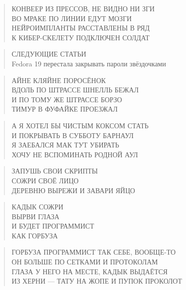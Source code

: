 \poemtitle{***}
\begin{verse}
КОНВЕЕР ИЗ ПРЕССОВ, НЕ ВИДНО НИ ЗГИ\\
ВО МРАКЕ ПО ЛИНИИ ЕДУТ МОЗГИ\\
НЕЙРОИМПЛАНТЫ РАССТАВЛЕНЫ В РЯД\\
К КИБЕР-СКЕЛЕТУ ПОДКЛЮЧЕН СОЛДАТ
\end{verse}

\poemtitle{***}
\begin{verse}
СЛЕДУЮЩИЕ СТАТЬИ\\
Fedora 19 перестала закрывать пароли звёздочками
\end{verse}

\poemtitle{***}
\begin{verse}
АЙНЕ КЛЯЙНЕ ПОРОСЁНОК \\
ВДОЛЬ ПО ШТРАССЕ ШНЕЛЛЬ БЕЖАЛ\\
И ПО ТОМУ ЖЕ ШТРАССЕ БОРЗО \\
ТИМУР В ФУФАЙКЕ ПРОЕЗЖАЛ
\end{verse}

\poemtitle{***}
\begin{verse}
А Я ХОТЕЛ БЫ ЧИСТЫМ КОКСОМ СТАТЬ\\
И ПОКРЫВАТЬ В СУББОТУ БАРНАУЛ\\
Я ЗАЕБАЛСЯ МАК ТУТ УБИРАТЬ\\
ХОЧУ НЕ ВСПОМИНАТЬ РОДНОЙ АУЛ
\end{verse}

\poemtitle{***}
\begin{verse}
ЗАПУШЬ СВОИ СКРИПТЫ\\
СОЖРИ СВОЁ ЛИЦО\\
ДЕРЕВНЮ ВЫРЕЖИ И ЗАВАРИ ЯЙЦО
\end{verse}

\poemtitle{***}
\begin{verse}
КАДЫК СОЖРИ\\
ВЫРВИ ГЛАЗА\\
И БУДЕТ ПРОГРАММИСТ\\
КАК ГОРБУЗА
\end{verse}

\poemtitle{***}
\begin{verse}
ГОРБУЗА ПРОГРАММИСТ ТАК СЕБЕ, ВООБЩЕ-ТО\\
ОН БОЛЬШЕ ПО СЕТКАМИ И ПРОТОКОЛАМ\\
ГЛАЗА У НЕГО НА МЕСТЕ, КАДЫК ВЫДАЁТСЯ\\
ИЗ ХЕРНИ — ТАТУ НА ЖОПЕ И ПУПОК ПРОКОЛОТ
\end{verse}

